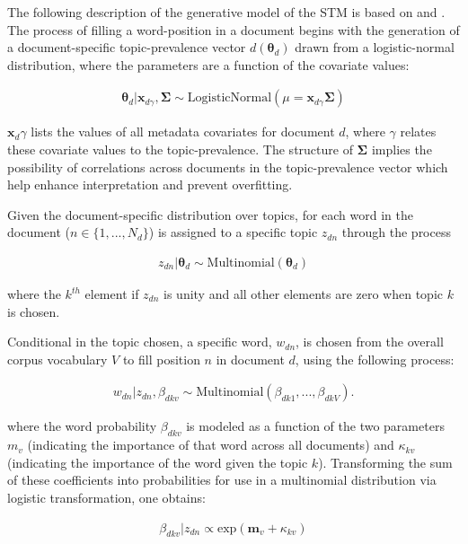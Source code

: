 \documentclass[12pt,a4paper,notitlepage]{article}
\begin{document}
The following description of the generative model of the STM is based on \citet{roberts_structural_2013} and . The process of filling a word-position in a document begins with the generation of a document-specific topic-prevalence vector $d(\boldsymbol{\theta}_d)$ drawn from a logistic-normal distribution, where the parameters are a function of the covariate values:

\begin{align*}
	\boldsymbol{\theta}_d|\boldsymbol{x}_{d\gamma},\boldsymbol{\Sigma} \sim \textrm{LogisticNormal}(\mu = \boldsymbol{x}_{d\gamma}\boldsymbol{\Sigma})
\end{align*}

$\boldsymbol{x}_d\gamma$ lists the values of all metadata covariates for document $d$, where $\gamma$ relates these covariate values to the topic-prevalence. The structure of $\boldsymbol{\Sigma}$ implies the possibility of correlations across documents in the topic-prevalence vector which help enhance interpretation and prevent overfitting. 

Given the document-specific distribution over topics, for each word in the document ($n \in \lbrace 1,...,N_d\rbrace$) is assigned to a specific topic $z_{dn}$ through the process

\begin{align*}
	z_{dn}|\boldsymbol{\theta}_d \sim \textrm{Multinomial}(\boldsymbol{\theta}_d)
\end{align*}

where the $k^{th}$ element if $z_{dn}$ is unity and all other elements are zero when topic $k$ is chosen. 

Conditional in the topic chosen, a specific word, $w_{dn}$, is chosen from the overall corpus vocabulary $V$ to fill position $n$ in document $d$, using the following process:

\begin{align*}
	w_{dn}|z_{dn},\beta_{dkv} \sim \textrm{Multinomial}(\beta_{dk1},...,\beta_{dkV}).
\end{align*}

where the word probability $\beta_{dkv}$ is modeled as a function of the two parameters $m_v$ (indicating the importance of that word across all documents) and $\kappa_{kv}$ (indicating the importance of the word given the topic $k$). Transforming the sum of these coefficients into probabilities for use in a multinomial distribution via logistic transformation, one obtains:

\begin{align*}
	\beta_{dkv}|z_{dn}\propto\textrm{exp}(\boldsymbol{m}_v+\kappa_{kv})
\end{align*}
\end{document}
